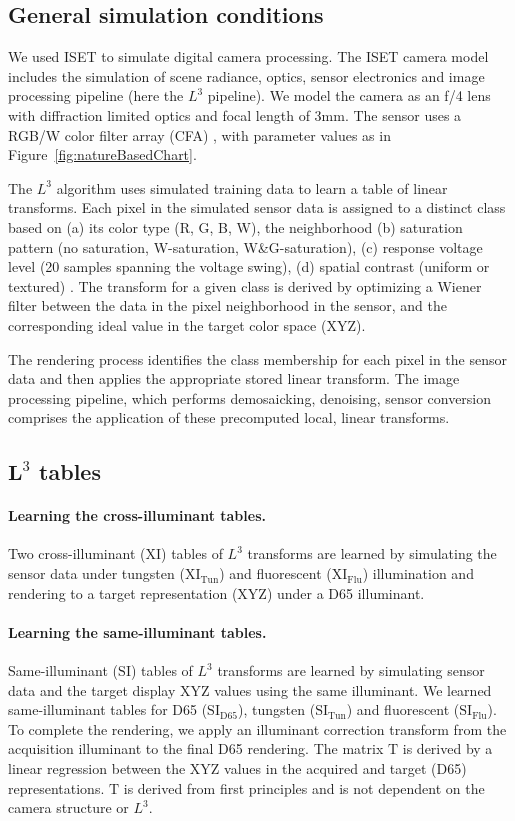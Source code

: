\documentclass[]{spie}
\newcommand{\Lcube}{L^3}
\newcommand{\XI}{\mathrm{XI}}
\newcommand{\SI}{\mathrm{SI}}
\newcommand{\XIT}{\mathrm{XI_{Tun}}}
\newcommand{\XIF}{\mathrm{XI_{Flu}}}
\newcommand{\SIT}{\mathrm{SI_{Tun}}}
\newcommand{\SIF}{\mathrm{SI_{Flu}}}
\newcommand{\SID}{\mathrm{SI_{D65}}}
\newcommand{\TT}{\mathrm{T}}
\begin{document}
\subsection{General simulation conditions}

We used ISET \cite{Farrell2003,Farrell2012} to simulate digital camera processing. The ISET camera model includes the simulation of scene radiance, optics, sensor electronics and image processing pipeline (here the $\Lcube$ pipeline). We model the camera as an f/4 lens with diffraction limited optics and focal length of 3mm. The sensor uses a RGB/W color filter array (CFA) \cite{Tian2014}, with parameter values as in Figure~\ref{fig:natureBasedChart}. 

The $\Lcube$ algorithm uses simulated training data to learn a table of linear transforms. Each pixel in the simulated sensor data is assigned to a distinct class based on (a) its color type (R, G, B, W), the neighborhood (b) saturation pattern (no saturation, W-saturation, W\&G-saturation), (c) response voltage level (20 samples spanning the voltage swing), (d) spatial contrast (uniform or textured)  \cite{Tian2014}. The transform for a given class is derived by optimizing a Wiener filter between the data in the pixel neighborhood in the sensor, and the corresponding ideal value in the target color space (XYZ). 

The rendering process identifies the class membership for each pixel in the sensor data and then applies the appropriate stored linear transform. The image processing pipeline, which performs demosaicking, denoising, sensor conversion comprises the application of these precomputed local, linear transforms.

\subsection{$\boldsymbol \Lcube$ tables}

\paragraph{Learning the cross-illuminant tables.} Two cross-illuminant ($\XI$) tables of $\Lcube$ transforms are learned by simulating the sensor data under tungsten ($\XIT$) and fluorescent ($\XIF$) illumination and rendering to a target representation (XYZ) under a D65 illuminant.

\paragraph{Learning the same-illuminant tables.} Same-illuminant ($\SI$) tables of $\Lcube$ transforms are learned by simulating sensor data and the target display XYZ values using the same illuminant. We learned same-illuminant tables for D65 ($\SID$), tungsten ($\SIT$) and fluorescent ($\SIF$). To complete the rendering, we apply an illuminant correction transform from the acquisition illuminant to the final D65 rendering. The matrix $\TT$ is derived by a linear regression between the XYZ values in the acquired and target (D65) representations. $\TT$ is derived from first principles and is not dependent on the camera structure or $\Lcube$. 
\end{document}
